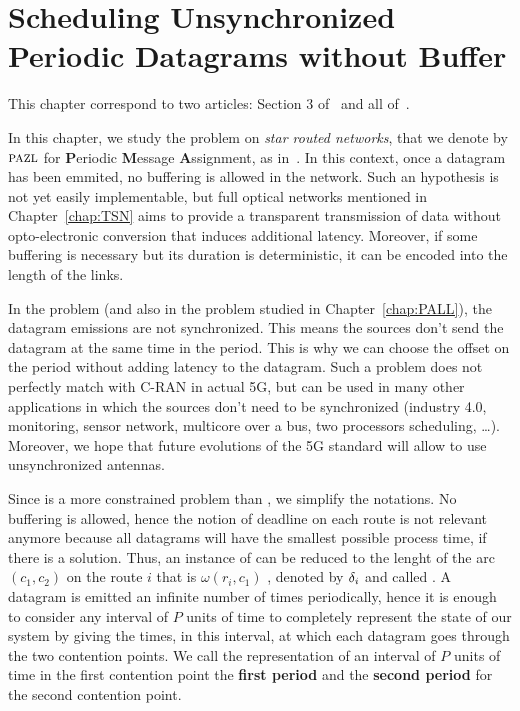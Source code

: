 
\chapter{Scheduling Unsynchronized Periodic Datagrams without Buffer}
\label{chap:PAZL}
\minitoc


This chapter correspond to two articles: Section $3$ of~\cite{DBLP:conf/ict/BarthGLMS18} and all of~\cite{DBLP:journals/corr/abs-2002-07606}.


 In this chapter, we study the problem \pazl on \emph{star routed networks}, that we denote by $\textsc{pazl}$ for \textbf{P}eriodic \textbf{M}essage \textbf{A}ssignment, as in~\cite{DBLP:journals/corr/abs-2002-07606}.
 In this context, once a datagram has been emmited, no buffering is allowed in the network. Such an hypothesis is not yet easily implementable, but full optical networks mentioned in Chapter~\ref{chap:TSN} aims to provide a transparent transmission of data without opto-electronic conversion that induces additional latency. 
 Moreover, if some buffering is necessary but its duration is deterministic, it can be encoded into the length of the links.

 In the problem \pma (and also in the problem \pall studied in Chapter~\ref{chap:PALL}), the datagram emissions are not synchronized. This means the sources don't send the datagram at the same time in the period. This is why we can choose the offset on the period without adding latency to the datagram. Such a problem does not perfectly match with C-RAN in actual 5G, but can be used in many other applications in which the sources don't need to be synchronized (industry 4.0, monitoring, sensor network, multicore over a bus, two processors scheduling, \dots).  Moreover, we hope that future evolutions of the 5G standard will allow to use unsynchronized antennas.

 Since \pma is a more constrained problem than \pall, we simplify the notations. No buffering is allowed, hence the notion of deadline on each route is not relevant anymore because all datagrams will have the smallest possible process time, if there is a solution. Thus, an instance of \pma can be reduced to the lenght of the arc $(c_1,c_2)$ on the route $i$ that is $\omega(r_i,c_1)$ , denoted by $\delta_i$ and called \nomdelay. A datagram is emitted an infinite number of times periodically, hence it is enough to consider any interval of $P$ units of time to completely represent the state of our system by giving the times, in this interval, at which each datagram goes through the two contention points. We call the representation of an interval of $P$ units of time in the first contention point the \textbf{first period} and the \textbf{second period} for the second contention point. 

